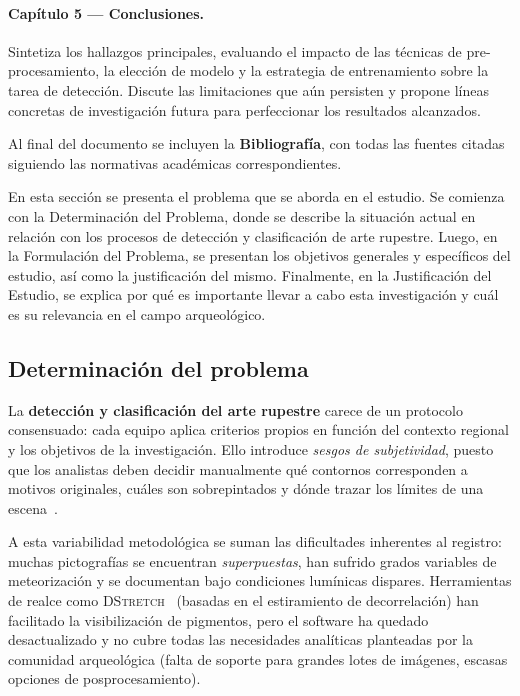 \paragraph{Capítulo 5 — Conclusiones.}
Sintetiza los hallazgos principales, evaluando el impacto de las técnicas de pre-procesamiento, la elección de modelo y la estrategia de entrenamiento sobre la tarea de detección.
Discute las limitaciones que aún persisten y propone líneas concretas de investigación futura para perfeccionar los resultados alcanzados.

\bigskip
Al final del documento se incluyen la \textbf{Bibliografía}, con todas las fuentes citadas siguiendo las normativas académicas correspondientes.

En esta sección se presenta el problema que se aborda en el estudio.
Se comienza con la Determinación del Problema, donde se describe la situación actual en relación con los procesos de detección y clasificación de arte rupestre.
Luego, en la Formulación del Problema, se presentan los objetivos generales y específicos del estudio, así como la justificación del mismo.
Finalmente, en la Justificación del Estudio, se explica por qué es importante llevar a cabo esta investigación y cuál es su relevancia en el campo arqueológico.

\subsection{Determinación del problema}

La \textbf{detección y clasificación del arte rupestre} carece de un protocolo consensuado: cada equipo aplica criterios propios en función del contexto regional y los objetivos de la investigación.
Ello introduce \emph{sesgos de subjetividad}, puesto que los analistas deben decidir manualmente qué contornos corresponden a motivos originales, cuáles son sobrepintados y dónde trazar los límites de una escena~\cite{aschero2012}.

A esta variabilidad metodológica se suman las dificultades inherentes al registro: muchas pictografías se encuentran \emph{superpuestas}, han sufrido grados variables de meteorización y se documentan bajo condiciones lumínicas dispares.
Herramientas de realce como \textsc{DStretch}~\cite{dstretch} (basadas en el estiramiento de decorrelación) han facilitado la visibilización de pigmentos, pero el software ha quedado desactualizado y no cubre todas las necesidades analíticas planteadas por la comunidad arqueológica (falta de soporte para grandes lotes de imágenes, escasas opciones de posprocesamiento).

